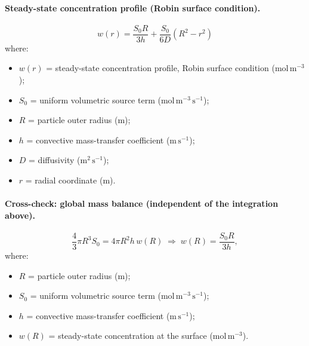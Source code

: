 \documentclass[11pt,a4paper]{article}
\begin{document}
\paragraph{Steady-state concentration profile (Robin surface condition).}

\begin{equation}
\boxed{\;w(r) = \frac{S_0 R}{3h} + \frac{S_0}{6D}\left(R^2 - r^2\right)\;}
\label{eq:b:w}
\end{equation}
\vspace{-0.3em}
\noindent where:

\begin{itemize}[leftmargin=1.6em,itemsep=1pt,topsep=3pt,parsep=0pt]
  \item $w(r)$ = steady-state concentration profile, Robin surface condition ($\mathrm{mol\,m^{-3}}$);
  \item $S_0$ = uniform volumetric source term ($\mathrm{mol\,m^{-3}\,s^{-1}}$);
  \item $R$ = particle outer radius ($\mathrm{m}$);
  \item $h$ = convective mass-transfer coefficient ($\mathrm{m\,s^{-1}}$);
  \item $D$ = diffusivity ($\mathrm{m^{2}\,s^{-1}}$);
  \item $r$ = radial coordinate ($\mathrm{m}$).
\end{itemize}



\paragraph{Cross-check: global mass balance (independent of the integration above).}

\begin{equation}
\frac{4}{3}\pi R^{3}S_0 = 4\pi R^{2}h\,w(R) \;\Longrightarrow\; w(R) = \frac{S_0R}{3h},
\label{eq:b:massbalance}
\end{equation}
\vspace{-0.3em}
\noindent where:

\begin{itemize}[leftmargin=1.6em,itemsep=1pt,topsep=3pt,parsep=0pt]
  \item $R$ = particle outer radius ($\mathrm{m}$);
  \item $S_0$ = uniform volumetric source term ($\mathrm{mol\,m^{-3}\,s^{-1}}$);
  \item $h$ = convective mass-transfer coefficient ($\mathrm{m\,s^{-1}}$);
  \item $w(R)$ = steady-state concentration at the surface ($\mathrm{mol\,m^{-3}}$).
\end{itemize}
\end{document}
